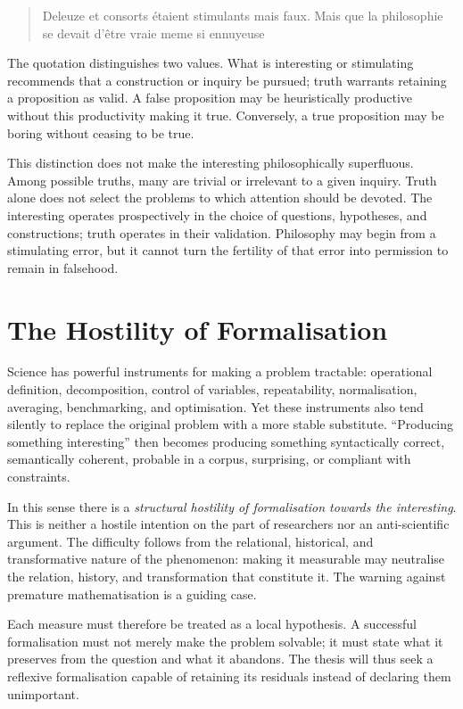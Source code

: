 \documentclass[11pt,a4paper]{article}
\begin{document}
\begin{quote}
Deleuze et consorts étaient stimulants mais faux. Mais que la philosophie se
devait d'être vraie meme si ennuyeuse
\end{quote}

The quotation distinguishes two values. What is interesting or stimulating
recommends that a construction or inquiry be pursued; truth warrants retaining
a proposition as valid. A false proposition may be heuristically productive
without this productivity making it true. Conversely, a true proposition may
be boring without ceasing to be true.

This distinction does not make the interesting philosophically superfluous.
Among possible truths, many are trivial or irrelevant to a given inquiry. Truth
alone does not select the problems to which attention should be devoted. The
interesting operates prospectively in the choice of questions, hypotheses, and
constructions; truth operates in their validation. Philosophy may begin from a
stimulating error, but it cannot turn the fertility of that error into
permission to remain in falsehood.

\section{The Hostility of Formalisation}

Science has powerful instruments for making a problem tractable: operational
definition, decomposition, control of variables, repeatability, normalisation,
averaging, benchmarking, and optimisation. Yet these instruments also tend
silently to replace the original problem with a more stable substitute.
``Producing something interesting'' then becomes producing something
syntactically correct, semantically coherent, probable in a corpus, surprising,
or compliant with constraints.

In this sense there is a \emph{structural hostility of formalisation towards the
interesting}. This is neither a hostile intention on the part of researchers nor
an anti-scientific argument. The difficulty follows from the relational,
historical, and transformative nature of the phenomenon: making it measurable
may neutralise the relation, history, and transformation that constitute it.
The warning against premature mathematisation
\parencite{russell1995rationality,russell1995awardlecture} is a guiding case.

Each measure must therefore be treated as a local hypothesis. A successful
formalisation must not merely make the problem solvable; it must state what it
preserves from the question and what it abandons. The thesis will thus seek a
reflexive formalisation capable of retaining its residuals instead of declaring
them unimportant.
\end{document}

